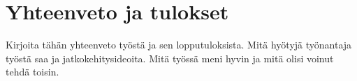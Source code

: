 \chapter{Yhteenveto ja tulokset}
\label{ch:yhteenveto ja tulokset}
Kirjoita tähän yhteenveto työstä ja sen lopputuloksista. Mitä hyötyjä työnantaja työstä saa ja jatkokehitysideoita. Mitä työssä meni hyvin ja mitä olisi voinut tehdä toisin.